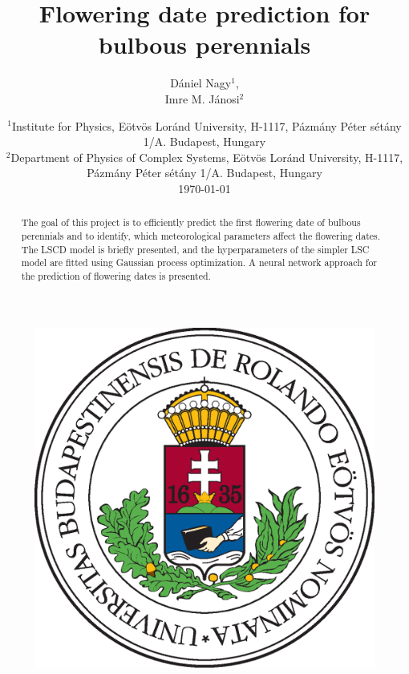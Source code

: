 \documentclass[11pt, a4paper]{article}
\title{Flowering date prediction for bulbous perennials}
\author{Dániel Nagy$^1$,\\Imre M. Jánosi$^2$}
\date{%
    $^1$Institute for Physics, Eötvös Loránd University, H-1117, Pázmány Péter sétány 1/A. Budapest, Hungary\\%
    $^2$Department of Physics of Complex Systems, Eötvös Loránd University, H-1117, Pázmány Péter sétány 1/A. Budapest, Hungary\\[2ex]%
    \today
}
\begin{document}
\maketitle
\vspace{2.5cm}
\begin{figure}[H]
    \centering
    \includegraphics[scale=0.3]{images/elte.eps}
\end{figure}
\vspace{0.5cm}

\newpage
\begin{abstract}
    The goal of this project is to efficiently predict the first flowering date of bulbous perennials and to identify,
    which meteorological parameters affect the flowering dates. The LSCD model is briefly presented, and the hyperparameters
    of the simpler LSC model are fitted using Gaussian process optimization. A neural network approach for the
    prediction of flowering dates is presented.
\end{abstract}
\end{document}
